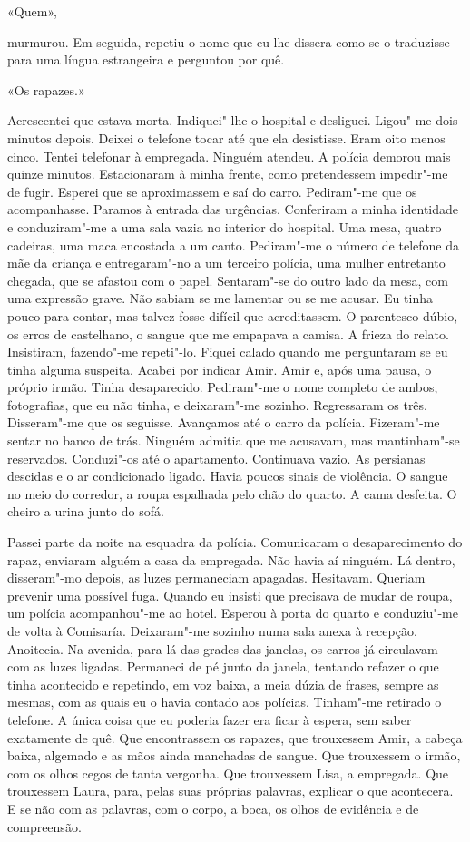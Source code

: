 «Quem»,

murmurou. Em seguida, repetiu o nome que eu lhe dissera como se o
traduzisse para uma língua estrangeira e perguntou por quê.

«Os rapazes.»

Acrescentei que estava morta. Indiquei"-lhe o hospital e desliguei.
Ligou"-me dois minutos depois. Deixei o telefone tocar até que ela
desistisse. Eram oito menos cinco. Tentei telefonar à empregada. Ninguém
atendeu. A polícia demorou mais quinze minutos. Estacionaram à minha
frente, como pretendessem impedir"-me de fugir. Esperei que se
aproximassem e saí do carro. Pediram"-me que os acompanhasse. Paramos à
entrada das urgências. Conferiram a minha identidade e conduziram"-me a
uma sala vazia no interior do hospital. Uma mesa, quatro cadeiras, uma
maca encostada a um canto. Pediram"-me o número de telefone da mãe da
criança e entregaram"-no a um terceiro polícia, uma mulher entretanto
chegada, que se afastou com o papel. Sentaram"-se do outro lado da mesa,
com uma expressão grave. Não sabiam se me lamentar ou se me acusar. Eu
tinha pouco para contar, mas talvez fosse difícil que acreditassem. O
parentesco dúbio, os erros de castelhano, o sangue que me empapava a
camisa. A frieza do relato. Insistiram, fazendo"-me repeti"-lo. Fiquei
calado quando me perguntaram se eu tinha alguma suspeita. Acabei por
indicar Amir. Amir e, após uma pausa, o próprio irmão. Tinha
desaparecido. Pediram"-me o nome completo de ambos, fotografias, que eu
não tinha, e deixaram"-me sozinho. Regressaram os três. Disseram"-me que
os seguisse. Avançamos até o carro da polícia. Fizeram"-me sentar no
banco de trás. Ninguém admitia que me acusavam, mas mantinham"-se
reservados. Conduzi"-os até o apartamento. Continuava vazio. As persianas
descidas e o ar condicionado ligado. Havia poucos sinais de violência. O
sangue no meio do corredor, a roupa espalhada pelo chão do quarto. A
cama desfeita. O cheiro a urina junto do sofá.

Passei parte da noite na esquadra da polícia. Comunicaram o
desaparecimento do rapaz, enviaram alguém a casa da empregada. Não havia
aí ninguém. Lá dentro, disseram"-mo depois, as luzes permaneciam
apagadas. Hesitavam. Queriam prevenir uma possível fuga. Quando eu
insisti que precisava de mudar de roupa, um polícia acompanhou"-me ao
hotel. Esperou à porta do quarto e conduziu"-me de volta à Comisaría.
Deixaram"-me sozinho numa sala anexa à recepção. Anoitecia. Na avenida,
para lá das grades das janelas, os carros já circulavam com as luzes
ligadas. Permaneci de pé junto da janela, tentando refazer o que tinha
acontecido e repetindo, em voz baixa, a meia dúzia de frases, sempre as
mesmas, com as quais eu o havia contado aos polícias. Tinham"-me
retirado o telefone. A única coisa que eu poderia fazer era ficar à
espera, sem saber exatamente de quê. Que encontrassem os rapazes, que
trouxessem Amir, a cabeça baixa, algemado e as mãos ainda manchadas de
sangue. Que trouxessem o irmão, com os olhos cegos de tanta vergonha.
Que trouxessem Lisa, a empregada. Que trouxessem Laura, para, pelas suas
próprias palavras, explicar o que acontecera. E se não com as palavras,
com o corpo, a boca, os olhos de evidência e de compreensão.

